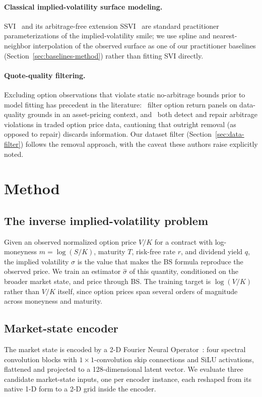 \documentclass[11pt]{article}
\begin{document}
\paragraph{Classical implied-volatility surface modeling.} SVI~\citep{Gatheral2004SVI} and its
arbitrage-free extension SSVI~\citep{GatherJacquier2014SSVI} are standard practitioner
parameterizations of the implied-volatility smile; we use spline and nearest-neighbor interpolation of
the observed surface as one of our practitioner baselines (Section~\ref{sec:baselines-method}) rather
than fitting SVI directly.

\paragraph{Quote-quality filtering.} Excluding option observations that violate static no-arbitrage
bounds prior to model fitting has precedent in the literature:~\citet{Buechner2021Factor} filter
option return panels on data-quality grounds in an asset-pricing context, and~\citet{Cohen2020Arbitrage}
both detect and repair arbitrage violations in traded option price data, cautioning that outright
removal (as opposed to repair) discards information. Our dataset filter (Section~\ref{sec:data-filter})
follows the removal approach, with the caveat these authors raise explicitly noted.

\section{Method}
\label{sec:method}

\subsection{The inverse implied-volatility problem}
\label{sec:method-inverse}
Given an observed normalized option price $V/K$ for a contract with log-moneyness $m = \log(S/K)$,
maturity $T$, risk-free rate $r$, and dividend yield $q$, the implied volatility $\sigma$ is the value
that makes the BS formula reproduce the observed price. We train an estimator $\hat\sigma$ of this
quantity, conditioned on the broader market state, and price through BS. The training target is
$\log(V/K)$ rather than $V/K$ itself, since option prices span several orders of magnitude across
moneyness and maturity.

\subsection{Market-state encoder}
\label{sec:method-encoder}
The market state is encoded by a 2-D Fourier Neural Operator~\citep{Li2021FNO}: four spectral
convolution blocks with $1{\times}1$-convolution skip connections and SiLU activations, flattened and
projected to a 128-dimensional latent vector. We evaluate three candidate market-state inputs, one per
encoder instance, each reshaped from its native 1-D form to a 2-D grid inside the encoder.
\end{document}
